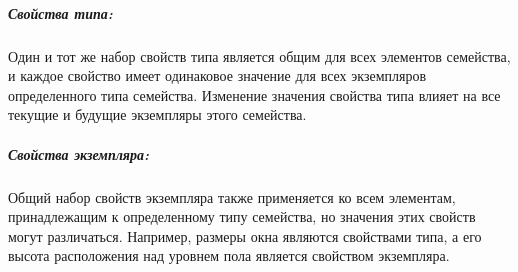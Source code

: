 \subparagraph{Свойства типа:}

Один и тот же набор свойств типа является общим для всех элементов семейства,
и каждое свойство имеет одинаковое значение для всех экземпляров определенного типа семейства.
Изменение значения свойства типа влияет на все текущие и будущие экземпляры этого семейства.

\subparagraph{Свойства экземпляра:}

Общий набор свойств экземпляра также применяется ко всем элементам,
принадлежащим к определенному типу семейства,
но значения этих свойств могут различаться.
Например, размеры окна являются свойствами типа,
а его высота расположения над уровнем пола является свойством экземпляра.
